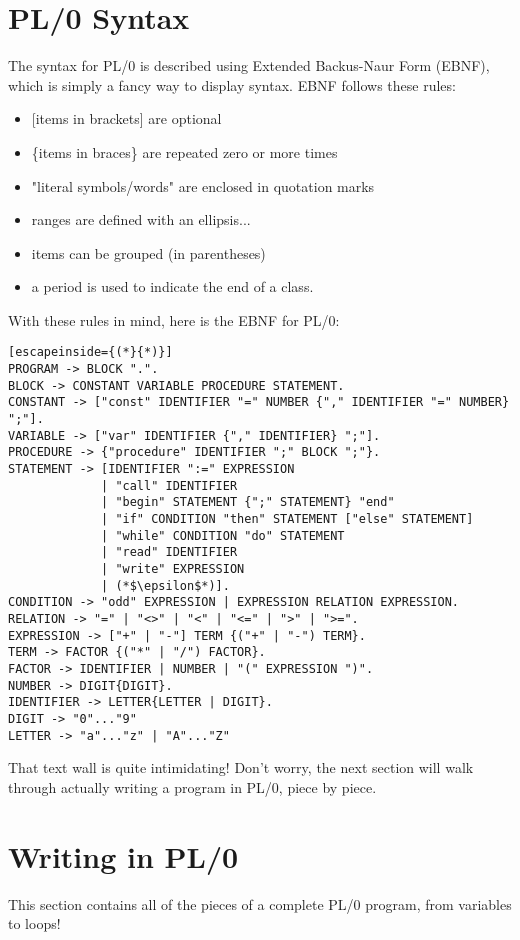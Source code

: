 \documentclass{article}
\begin{document}
\section*{PL/0 Syntax}
The syntax for PL/0 is described using Extended Backus-Naur Form (EBNF), which is simply
a fancy way to display syntax. EBNF follows these rules:
\begin{itemize}
    \item {[}items in brackets{]} are optional
    \item \{items in braces\} are repeated zero or more times
    \item "literal symbols/words" are enclosed in quotation marks
    \item ranges are defined with an ellipsis...
    \item items can be grouped (in parentheses)
    \item a period is used to indicate the end of a class.
\end{itemize}
With these rules in mind, here is the EBNF for PL/0:
\begin{lstlisting}[escapeinside={(*}{*)}]
PROGRAM -> BLOCK ".".
BLOCK -> CONSTANT VARIABLE PROCEDURE STATEMENT.
CONSTANT -> ["const" IDENTIFIER "=" NUMBER {"," IDENTIFIER "=" NUMBER} ";"].
VARIABLE -> ["var" IDENTIFIER {"," IDENTIFIER} ";"].
PROCEDURE -> {"procedure" IDENTIFIER ";" BLOCK ";"}.
STATEMENT -> [IDENTIFIER ":=" EXPRESSION
             | "call" IDENTIFIER
             | "begin" STATEMENT {";" STATEMENT} "end"
             | "if" CONDITION "then" STATEMENT ["else" STATEMENT]
             | "while" CONDITION "do" STATEMENT
             | "read" IDENTIFIER
             | "write" EXPRESSION
             | (*$\epsilon$*)].
CONDITION -> "odd" EXPRESSION | EXPRESSION RELATION EXPRESSION.
RELATION -> "=" | "<>" | "<" | "<=" | ">" | ">=".
EXPRESSION -> ["+" | "-"] TERM {("+" | "-") TERM}.
TERM -> FACTOR {("*" | "/") FACTOR}.
FACTOR -> IDENTIFIER | NUMBER | "(" EXPRESSION ")".
NUMBER -> DIGIT{DIGIT}.
IDENTIFIER -> LETTER{LETTER | DIGIT}.
DIGIT -> "0"..."9"
LETTER -> "a"..."z" | "A"..."Z"
\end{lstlisting}
That text wall is quite intimidating! Don't worry, the next section will walk
through actually writing a program in PL/0, piece by piece.

\pagebreak

\section*{Writing in PL/0}
This section contains all of the pieces of a complete PL/0 program, from variables to loops!
\end{document}
